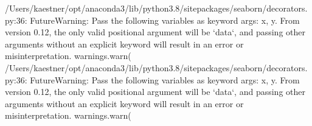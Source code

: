 \documentclass[letterpaper,10pt,english]{sphinxmanual}
\begin{document}
\begin{sphinxVerbatim}[commandchars=\\\{\}]
 
  
  
  
 
\end{sphinxVerbatim}

\begin{sphinxVerbatim}[commandchars=\\\{\}]
/Users/kaestner/opt/anaconda3/lib/python3.8/site\PYGZhy{}packages/seaborn/\PYGZus{}decorators.py:36: FutureWarning: Pass the following variables as keyword args: x, y. From version 0.12, the only valid positional argument will be `data`, and passing other arguments without an explicit keyword will result in an error or misinterpretation.
  warnings.warn(
/Users/kaestner/opt/anaconda3/lib/python3.8/site\PYGZhy{}packages/seaborn/\PYGZus{}decorators.py:36: FutureWarning: Pass the following variables as keyword args: x, y. From version 0.12, the only valid positional argument will be `data`, and passing other arguments without an explicit keyword will result in an error or misinterpretation.
  warnings.warn(
\end{sphinxVerbatim}
\end{document}
